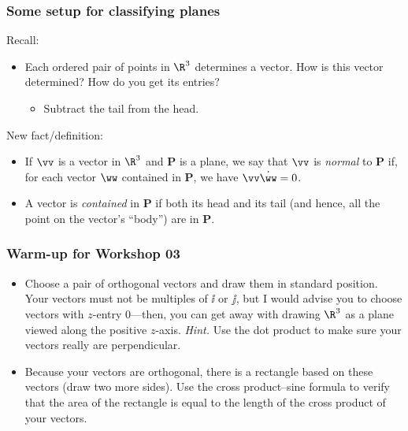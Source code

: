 \documentclass[11pt,ignorenonframetext,]{beamer}
\begin{document}
\begin{frame}\frametitle{Some setup for classifying planes}

Recall:

\begin{itemize}[<+->]
\itemsep1pt\parskip0pt
\item
  Each ordered pair of points in $\R^3$ determines a vector. How is this
  vector determined? How do you get its entries?

  \begin{itemize}[<+->]
  \itemsep1pt\parskip0pt
  \item
    Subtract the tail from the head.
  \end{itemize}
\end{itemize}

New fact/definition:

\begin{itemize}[<+->]
\item
  If $\vv$ is a vector in $\R^3$ and $\mathbf{P}$ is a plane, we say
  that $\vv$ is \emph{normal} to $\mathbf{P}$ if, for each vector $\ww$
  contained in $\mathbf{P}$, we have $\vv \dot \ww  = 0$.
\item
  A vector is \emph{contained} in $\mathbf{P}$ if both its head and its
  tail (and hence, all the point on the vector's ``body'') are in
  $\mathbf{P}$.
\end{itemize}

\end{frame}

\begin{frame}\frametitle{Warm-up for Workshop 03}

\begin{itemize}[<+->]
\item
  Choose a pair of orthogonal vectors and draw them in standard
  position. Your vectors must not be multiples of $\ii$ or $\jj$, but I
  would advise you to choose vectors with $z$-entry $0$---then, you can
  get away with drawing $\R^{3}$ as a plane viewed along the positive
  $z$-axis. \emph{Hint.} Use the dot product to make sure your vectors
  really are perpendicular.
\item
  Because your vectors are orthogonal, there is a rectangle based on
  these vectors (draw two more sides). Use the cross product--sine
  formula to verify that the area of the rectangle is equal to the
  length of the cross product of your vectors.
\end{itemize}

\end{frame}
\end{document}
